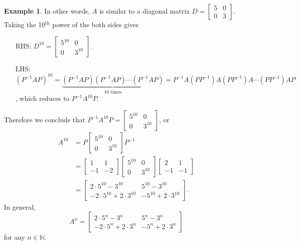 \documentclass[12pt,letterpaper]{book}
\numberwithin{equation}{section}
\theoremstyle{definition}
\newtheorem{example}[thm]{\textbf{Example}}
\begin{document}
\begin{example}
In other words, $A$ is similar to a diagonal matrix $D=\left[\begin{array}{rr} 5 & 0 \\ 0 & 3
\end{array}\right]$. Taking the 10$^{\text{th}}$ power of the both
sides gives
\begin{enumerate}
\item[RHS:] $D^{10}=\left[\begin{array}{cc} 5^{10} & 0 \\ 0 & 3^{10}
\end{array}\right]$.
\item[LHS:] $(P^{-1}AP)^{10}=\underbrace{(P^{-1}AP)(P^{-1}AP)\cdots
(P^{-1}AP)}_{10 \text{ times}}=P^{-1}A(PP^{-1})A(PP^{-1})A\cdots
(PP^{-1})AP$, which reduces to $P^{-1}A^{10}P$.
\end{enumerate}

Therefore we conclude that $P^{-1}A^{10}P=\left[\begin{array}{cc}
5^{10} & 0 \\ 0 & 3^{10}
\end{array}\right]$, or
\begin{align*}A^{10}&=P\left[\begin{array}{cc}
5^{10} & 0 \\ 0 & 3^{10}
\end{array}\right]P^{-1}\\
&=\left[\begin{array}{rr} 1 & 1 \\ -1 & -2
\end{array}\right]\left[\begin{array}{cc}
5^{10} & 0 \\ 0 & 3^{10}
\end{array}\right]\left[\begin{array}{rr}
2 & 1 \\ -1 & -1
\end{array}\right]\\
&=\left[\begin{array}{cc}
2\cdot5^{10}-3^{10} & 5^{10}-3^{10} \\ -2\cdot5^{10}+2\cdot3^{10} &
-5^{10}+2\cdot3^{10}
\end{array}\right].\end{align*}
In general, $$A^{n}=\left[\begin{array}{cc}
2\cdot5^{n}-3^{n} & 5^{n}-3^{n} \\ -2\cdot5^{n}+2\cdot3^{n} &
-5^{n}+2\cdot3^{n}
\end{array}\right]$$
for any $n\in \mathbb{N}$.
\end{example}
\end{document}
